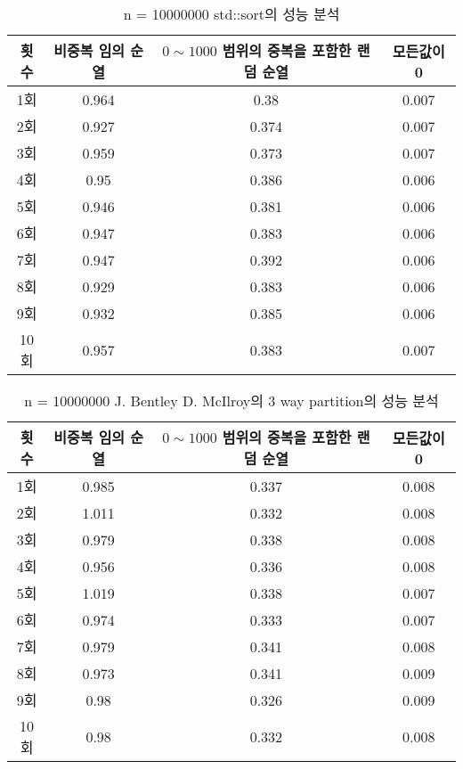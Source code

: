 \begin{table}[h!]
	\centering
	\begin{tabular}{|c|c|c|c|}
		\hline\hline
		횟수 & 비중복 임의 순열 & $0 \sim 1000$ 범위의 중복을 포함한 랜덤 순열 & 모든값이 0 \\ \hline
		1회 & 0.964 & 0.38 & 0.007 \\ \hline
		2회 & 0.927 & 0.374 & 0.007 \\ \hline
		3회 & 0.959 & 0.373 & 0.007 \\ \hline
		4회 & 0.95 & 0.386 & 0.006 \\ \hline
		5회 & 0.946 & 0.381 & 0.006 \\ \hline
		6회 & 0.947 & 0.383 & 0.006 \\ \hline
		7회 & 0.947 & 0.392 & 0.006 \\ \hline
		8회 & 0.929 & 0.383 & 0.006 \\ \hline
		9회 & 0.932 & 0.385 & 0.006 \\ \hline
		10회 & 0.957 & 0.383 & 0.007 \\ \hline
		\hline\hline
	\end{tabular}
	\caption{n = 10000000 std::sort의 성능 분석}
\end{table}

\begin{table}[h!]
	\centering
	\begin{tabular}{|c|c|c|c|}
		\hline\hline
		횟수 & 비중복 임의 순열 & $0 \sim 1000$ 범위의 중복을 포함한 랜덤 순열 & 모든값이 0 \\ \hline
		1회 & 0.985 & 0.337 & 0.008 \\ \hline
		2회 & 1.011 & 0.332 & 0.008 \\ \hline
		3회 & 0.979 & 0.338 & 0.008 \\ \hline
		4회 & 0.956 & 0.336 & 0.008 \\ \hline
		5회 & 1.019 & 0.338 & 0.007 \\ \hline
		6회 & 0.974 & 0.333 & 0.007 \\ \hline
		7회 & 0.979 & 0.341 & 0.008 \\ \hline
		8회 & 0.973 & 0.341 & 0.009 \\ \hline
		9회 & 0.98 & 0.326 & 0.009 \\ \hline
		10회 & 0.98 & 0.332 & 0.008 \\ \hline
		\hline\hline
	\end{tabular}
	\caption{n = 10000000  J. Bentley  D. McIlroy의 3 way partition의 성능 분석}
\end{table}


\begin{lstlisting}[style = CStyle]
    
\end{lstlisting}


